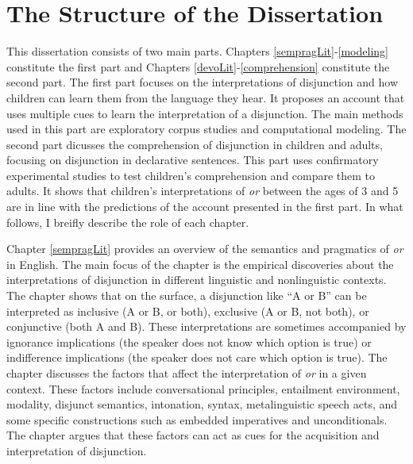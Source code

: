 \documentclass[oneside]{report}
\theoremstyle{definition}
\theoremstyle{definition}
\theoremstyle{definition}
\theoremstyle{remark}
\begin{document}
\section{The Structure of the
Dissertation}\label{the-structure-of-the-dissertation}

This dissertation consists of two main parts. Chapters
\ref{sempragLit}-\ref{modeling} constitute the first part and Chapters
\ref{devoLit}-\ref{comprehension} constitute the second part. The first
part focuses on the interpretations of disjunction and how children can
learn them from the language they hear. It proposes an account that uses
multiple cues to learn the interpretation of a disjunction. The main
methods used in this part are exploratory corpus studies and
computational modeling. The second part dicusses the comprehension of
disjunction in children and adults, focusing on disjunction in
declarative sentences. This part uses confirmatory experimental studies
to test children's comprehension and compare them to adults. It shows
that children's interpretations of \emph{or} between the ages of 3 and 5
are in line with the predictions of the account presented in the first
part. In what follows, I breifly describe the role of each chapter.

Chapter \ref{sempragLit} provides an overview of the semantics and
pragmatics of \emph{or} in English. The main focus of the chapter is the
empirical discoveries about the interpretations of disjunction in
different linguistic and nonlinguistic contexts. The chapter shows that
on the surface, a disjunction like ``A or B'' can be interpreted as
inclusive (A or B, or both), exclusive (A or B, not both), or
conjunctive (both A and B). These interpretations are sometimes
accompanied by ignorance implications (the speaker does not know which
option is true) or indifference implications (the speaker does not care
which option is true). The chapter discusses the factors that affect the
interpretation of \emph{or} in a given context. These factors include
conversational principles, entailment environment, modality, disjunct
semantics, intonation, syntax, metalinguistic speech acts, and some
specific constructions such as embedded imperatives and unconditionals.
The chapter argues that these factors can act as cues for the
acquisition and interpretation of disjunction.
\end{document}

